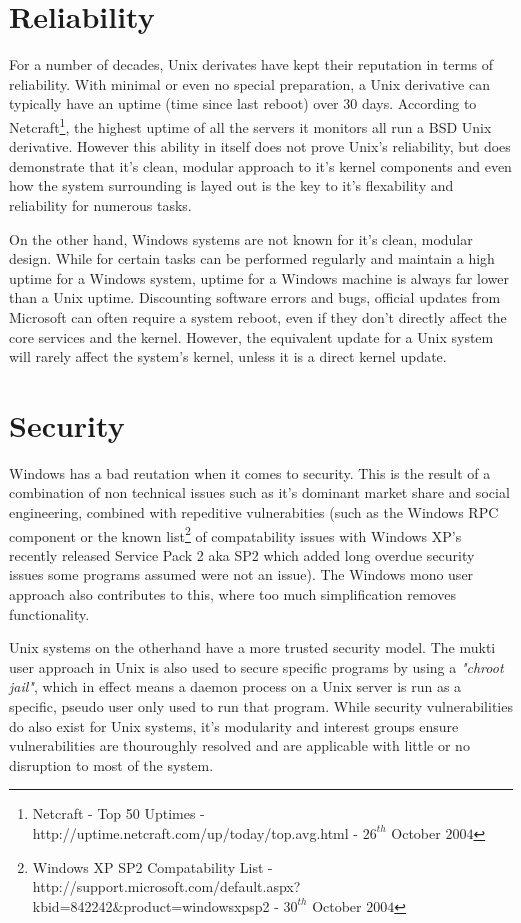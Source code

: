 \documentclass[a4paper,10pt]{article}
\begin{document}
\section*{Reliability}

For a number of decades, Unix derivates have kept their reputation in
terms of reliability. With minimal or even no special preparation, a
Unix derivative can typically have an uptime (time since last reboot) 
over 30 days. According to Netcraft\footnote{Netcraft - Top 50 Uptimes 
-  http://uptime.netcraft.com/up/today/top.avg.html - $26^{th}$ October
$2004$}, the highest uptime of all the servers it monitors all run a BSD
Unix derivative. However this ability in itself does not prove Unix's
reliability, but does demonstrate that it's clean, modular approach to 
it's kernel components and even how the system surrounding is layed out 
is the key to it's flexability and reliability for numerous tasks.

On the other hand, Windows systems are not known for it's clean, modular
design. While for certain tasks can be performed regularly and maintain
a high uptime for a Windows system, uptime for a Windows machine is
always far lower than a Unix uptime. Discounting software errors and
bugs, official updates from Microsoft can often require a system reboot,
even if they don't directly affect the core services and the kernel.
However, the equivalent update for a Unix system will rarely affect the
system's kernel, unless it is a direct kernel update.

\section*{Security}

Windows has a bad reutation when it comes to security. This is the
result of a combination of non technical issues such as it's dominant 
market share and social engineering, combined with repeditive vulnerabities 
(such as the Windows RPC component or the known 
list\footnote{Windows XP SP2 Compatability List -
http://support.microsoft.com/default.aspx?kbid=842242\&product=windowsxpsp2
- $30^{th}$ October $2004$} of compatability issues with Windows XP's
recently released Service Pack 2 aka SP2 which added long overdue security issues
some programs assumed were not an issue). The Windows mono user approach
also contributes to this, where too much simplification removes
functionality.

Unix systems on the otherhand have a more trusted security model. The
mukti user approach in Unix is also used to secure specific programs by
using a \emph{"chroot jail"}, which in effect means a daemon process on a
Unix server is run as a specific, pseudo user only used to run that
program. While security vulnerabilities do also exist for Unix systems,
it's modularity and interest groups ensure vulnerabilities are
thouroughly resolved and are applicable with little or no disruption to
most of the system.
\end{document}
